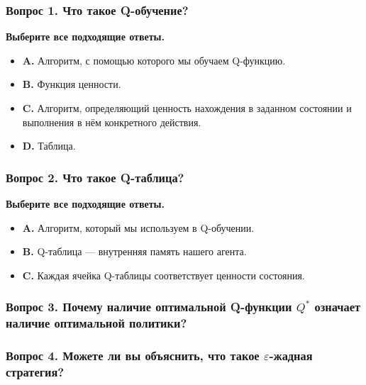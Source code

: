 \documentclass[11pt,a4paper]{article}
\begin{document}
\subsubsection{Вопрос 1. Что такое Q-обучение?}\label{q1-what-is-q-learning}

\textbf{Выберите все подходящие ответы.}

\begin{itemize}
\tightlist
\item
  \textbf{A.} Алгоритм, с помощью которого мы обучаем Q-функцию.
\item
  \textbf{B.} Функция ценности.
\item
  \textbf{C.} Алгоритм, определяющий ценность нахождения в заданном состоянии и выполнения в нём конкретного действия.
\item
  \textbf{D.} Таблица.
\end{itemize}

\subsubsection{Вопрос 2. Что такое Q-таблица?}\label{q2-what-is-a-q-table}

\textbf{Выберите все подходящие ответы.}

\begin{itemize}
\tightlist
\item
  \textbf{A.} Алгоритм, который мы используем в Q-обучении.
\item
  \textbf{B.} Q-таблица --- внутренняя память нашего агента.
\item
  \textbf{C.} Каждая ячейка Q-таблицы соответствует ценности состояния.
\end{itemize}

\subsubsection{\texorpdfstring{Вопрос 3. Почему наличие оптимальной Q-функции \(Q^*\) означает наличие оптимальной политики?}{Вопрос 3. Почему наличие оптимальной Q-функции Q* означает наличие оптимальной политики?}}\label{q3-why-if-we-have-an-optimal-q-function-q-we-have-an-optimal-policy}

\subsubsection{\texorpdfstring{Вопрос 4. Можете ли вы объяснить, что такое \(\varepsilon\)-жадная стратегия?}{Вопрос 4. Можете ли вы объяснить, что такое epsilon-жадная стратегия?}}\label{q4-can-you-explain-what-is-epsilon-greedy-strategy}
\end{document}
